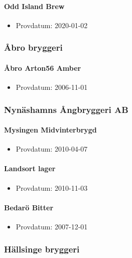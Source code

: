 \documentclass[11pt]{article}
\begin{document}
\paragraph{Odd Island Brew}
\label{sec:org07efec1}
\begin{itemize}
\item Provdatum: 2020-01-02
\end{itemize}
\subsubsection{Åbro bryggeri}
\label{sec:orga849e0e}
\paragraph{Åbro Arton56 Amber}
\label{sec:org6a45a1a}
\begin{itemize}
\item Provdatum: 2006-11-01
\end{itemize}
\subsubsection{Nynäshamns Ångbryggeri AB}
\label{sec:org3cc4d21}
\paragraph{Mysingen Midvinterbrygd}
\label{sec:org1a7b6da}
\begin{itemize}
\item Provdatum: 2010-04-07
\end{itemize}
\paragraph{Landsort lager}
\label{sec:orgd27f649}
\begin{itemize}
\item Provdatum: 2010-11-03
\end{itemize}
\paragraph{Bedarö Bitter}
\label{sec:org045604d}
\begin{itemize}
\item Provdatum: 2007-12-01
\end{itemize}
\subsubsection{Hällsinge bryggeri}
\label{sec:org2164809}
\end{document}
